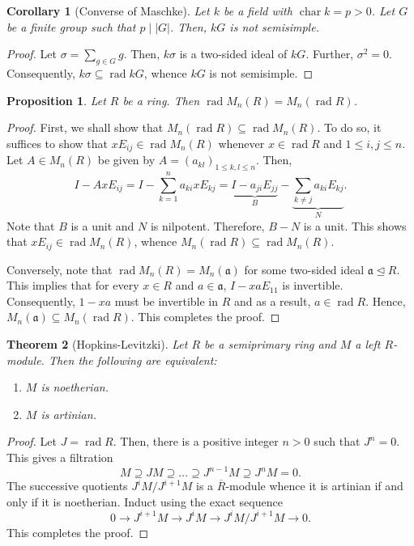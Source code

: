 \documentclass[12pt]{article}
\theoremstyle{thmstyle}
\newtheorem{theorem}{Theorem}[section]
\newtheorem{proposition}[theorem]{Proposition}
\theoremstyle{defstyle}
\newtheorem*{corollary}{Corollary}
\newcommand{\chr}{\operatorname{char}}
\newcommand{\fraka}{\mathfrak{a}} %
\renewcommand{\le}{\leqslant}
\newcommand{\rad}{\operatorname{rad}}
\begin{document}
\begin{corollary}[Converse of Maschke]
    Let $k$ be a field with $\chr k = p > 0$. Let $G$ be a finite group such that $p\mid |G|$. Then, $kG$ is not semisimple.
\end{corollary}
\begin{proof}
    Let $\sigma = \sum_{g\in G} g$. Then, $k\sigma$ is a two-sided ideal of $kG$. Further, $\sigma^2 = 0$. Consequently, $k\sigma\subseteq\rad kG$, whence $kG$ is not semisimple.
\end{proof}

\begin{proposition}
    Let $R$ be a ring. Then $\rad M_n(R) = M_n(\rad R)$.
\end{proposition}
\begin{proof}
    First, we shall show that $M_n(\rad R)\subseteq\rad M_n(R)$. To do so, it suffices to show that $xE_{ij}\in\rad M_n(R)$ whenever $x\in\rad R$ and $1\le i,j\le n$. Let $A\in M_n(R)$ be given by $A = (a_{kl})_{1\le k,l\le n}$. Then, 
    \begin{equation*}
        I - Ax E_{ij} = I - \sum_{k = 1}^n a_{ki}x E_{kj} = \underbrace{I - a_{ji}E_{jj}}_{B} - \underbrace{\sum_{k\ne j} a_{ki}E_{kj}}_N.
    \end{equation*}
    Note that $B$ is a unit and $N$ is nilpotent. Therefore, $B - N$ is a unit. This shows that $xE_{ij}\in\rad M_n(R)$, whence $M_n(\rad R)\subseteq\rad M_n(R)$.

    Conversely, note that $\rad M_n(R) = M_n(\fraka)$ for some two-sided ideal $\fraka\unlhd R$. This implies that for every $x\in R$ and $a\in\fraka$, $I - xaE_{11}$ is invertible. Consequently, $1 - xa$ must be invertible in $R$ and as a result, $a\in\rad R$. Hence, $M_n(\fraka)\subseteq M_n(\rad R)$. This completes the proof.
\end{proof}

\begin{theorem}[Hopkins-Levitzki]
    Let $R$ be a semiprimary ring and $M$ a left $R$-module. Then the following are equivalent: 
    \begin{enumerate}[label=(\arabic*)]
        \item $M$ is noetherian.
        \item $M$ is artinian.
    \end{enumerate}
\end{theorem}
\begin{proof}
    Let $J = \rad R$. Then, there is a positive integer $n > 0$ such that $J^n = 0$. This gives a filtration 
    \begin{equation*}
        M\supseteq JM\supseteq\dots\supseteq J^{n - 1}M\supseteq J^nM = 0.
    \end{equation*}
    The successive quotients $J^iM/J^{i + 1}M$ is a $\overline R$-module whence it is artinian if and only if it is noetherian. Induct using the exact sequence 
    \begin{equation*}
        0\longrightarrow J^{i + 1}M\longrightarrow J^i M\longrightarrow J^iM/J^{i + 1}M\longrightarrow 0.
    \end{equation*}
    This completes the proof.
\end{proof}
\end{document}
